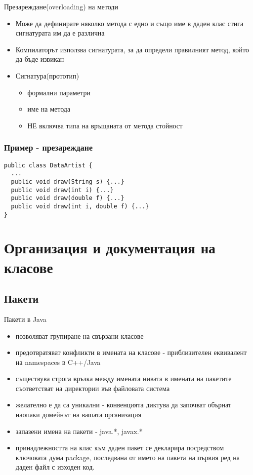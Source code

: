 \documentclass{beamer}
\begin{document}
\begin{frame}{Презареждане(overloading) на методи}
  \transdissolve
  \begin{itemize}
  \item Може да дефинирате няколко метода с едно и също име в даден
    клас стига сигнатурата им да е различна \pause
  \item Компилаторът използва сигнатурата, за да определи правилният
    метод, който да бъде извикан \pause
  \item Сигнатура(прототип)
    \begin{itemize}
    \item формални параметри
    \item име на метода
    \item \alert{НЕ} включва типа на връщаната от метода стойност
    \end{itemize}
  \end{itemize}
\end{frame}

\begin{frame}[fragile]
  \frametitle{Пример - презареждане}
  \transdissolve
\begin{lstlisting}
public class DataArtist {
  ...
  public void draw(String s) {...}
  public void draw(int i) {...}
  public void draw(double f) {...}
  public void draw(int i, double f) {...}
}
\end{lstlisting}
\end{frame}

\section{Организация и документация на класове}
\subsection{Пакети}
\begin{frame}{Пакети в Java}
  \transdissolve
  \begin{itemize}
  \item позволяват групиране на свързани класове \pause
  \item предотвратяват конфликти в имената на класове - приблизителен
    еквивалент на namespaces в C++/Java \pause
  \item съществува строга връзка между имената нивата в имената на
    пакетите съответстват на директории във файловата система \pause
  \item желателно е да са уникални - конвенцията диктува да започват
    обърнат наопаки домейнът на вашата организация \pause
  \item запазени имена на пакети - java.*, javax.*
  \item принадлежността на клас към даден пакет се декларира
    посредством ключовата дума package, последвана от името на пакета
    на първия ред на даден файл с изходен код.
  \end{itemize}
\end{frame}
\end{document}

